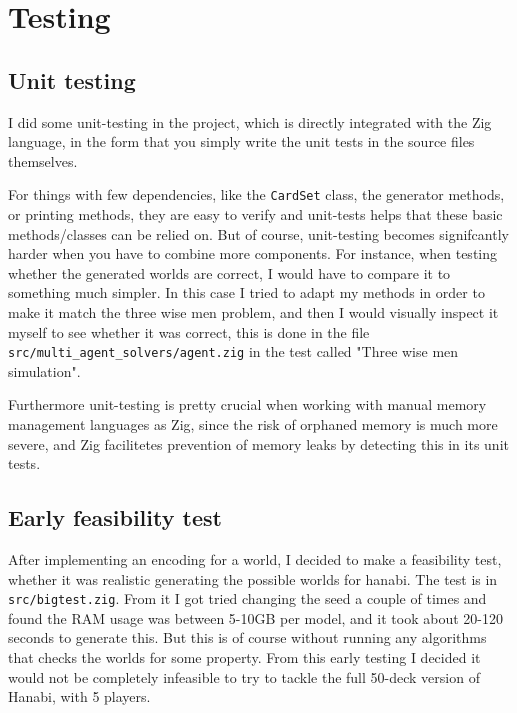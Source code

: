 \section{Testing}
\subsection{Unit testing}
I did some unit-testing in the project, which is directly integrated with the Zig language, in the form that you simply write the unit tests in the source files themselves. 

For things with few dependencies, like the {\tt CardSet} class, the generator methods, or printing methods, they are easy to verify and unit-tests helps that these basic methods/classes can be relied on. But of course, unit-testing becomes signifcantly harder when you have to combine more components. For instance, when testing whether the generated worlds are correct, I would have to compare it to something much simpler. In this case I tried to adapt my methods in order to make it match the three wise men problem, and then I would visually inspect it myself to see whether it was correct, this is done in the file {\tt src/multi\_agent\_solvers/agent.zig} in the test called "Three wise men simulation".

Furthermore unit-testing is pretty crucial when working with manual memory management languages as Zig, since the risk of orphaned memory is much more severe, and Zig facilitetes prevention of memory leaks by detecting this in its unit tests. 


\subsection{Early feasibility test}
After implementing an encoding for a world, I decided to make a feasibility test, whether it was realistic generating the possible worlds for hanabi. The test is in {\tt src/bigtest.zig}. From it I got tried changing the seed a couple of times and found the RAM usage was between 5-10GB per model, and it took about 20-120 seconds to generate this. But this is of course without running any algorithms that checks the worlds for some property.
From this early testing I decided it would not be completely infeasible to try to tackle the full 50-deck version of Hanabi, with 5 players.

